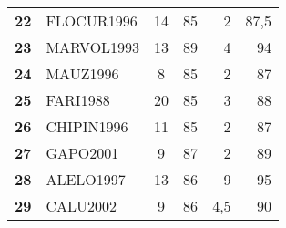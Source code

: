 \begin{landscape}
\begin{table}
\begin{varwidth}{\columnwidth}
\begin{tabular}{>{\bfseries}clc*{3}{D{,}{,}{-1}}}
22 & FLOCUR1996 & 14 & 85 & 2 & 87,5 \\
23 & MARVOL1993 & 13 & 89 & 4 & 94 \\
24 & MAUZ1996 & 8 & 85 & 2 & 87 \\
25 & FARI1988 & 20 & 85 & 3 & 88 \\
26 & CHIPIN1996 & 11 & 85 & 2 & 87 \\
27 & GAPO2001 & 9 & 87 & 2 & 89 \\
28 & ALELO1997 & 13 & 86 & 9 & 95 \\
29 & CALU2002 & 9 & 86 & 4,5 & 90 \\
\bottomrule
\end{tabular}
\end{varwidth}
\end{table}

\end{landscape}